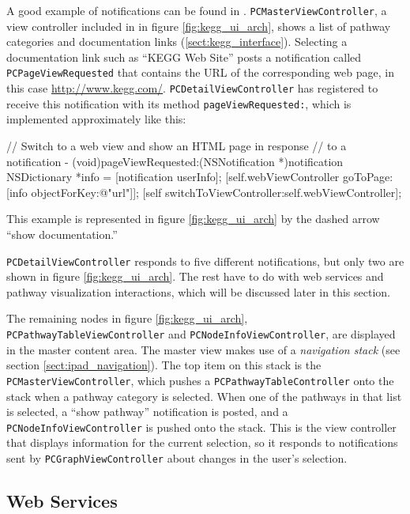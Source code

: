 A good example of notifications can be found in \keggapp.
\texttt{PCMasterViewController}, a view controller included in in figure
\ref{fig:kegg_ui_arch}, shows a list of pathway categories and documentation
links (\ref{sect:kegg_interface}). Selecting a documentation link such as ``KEGG
Web Site'' posts a notification called \texttt{PCPageViewRequested} that
contains the URL of the corresponding web page, in this case
\href{http://www.kegg.com}{http:/\slash www.kegg.com\slash}.
\texttt{PCDetailViewController} has registered to receive this notification with
its method \texttt{pageViewRequested:}, which is implemented approximately like
this:

\begin{objc}
// Switch to a web view and show an HTML page in response
// to a notification
- (void)pageViewRequested:(NSNotification *)notification
{
    NSDictionary *info = [notification userInfo];
    [self.webViewController goToPage:[info objectForKey:@"url"]];
    [self switchToViewController:self.webViewController];
}
\end{objc}

This example is represented in figure \ref{fig:kegg_ui_arch} by the dashed arrow
``show documentation.''

\texttt{PCDetailViewController} responds to five different notifications, but
only two are shown in figure \ref{fig:kegg_ui_arch}. The rest have to do with
web services and pathway visualization interactions, which will be discussed
later in this section.

The remaining nodes in figure \ref{fig:kegg_ui_arch},
\texttt{PCPathwayTableViewController} and \texttt{PCNodeInfoViewController}, are
displayed in the master content area. The master view makes use of a
\emph{navigation stack} (see section \ref{sect:ipad_navigation}). The top item
on this stack is the \texttt{PCMasterViewController}, which pushes a
\texttt{PCPathwayTableController} onto the stack when a pathway category is
selected. When one of the pathways in that list is selected, a ``show pathway''
notification is posted, and a \texttt{PCNodeInfoViewController} is pushed onto
the stack. This is the view controller that displays information for the current
selection, so it responds to notifications sent by
\texttt{PCGraphViewController} about changes in the user's selection.

\subsection{Web Services}
\label{sect:kegg_impl_web_services}

